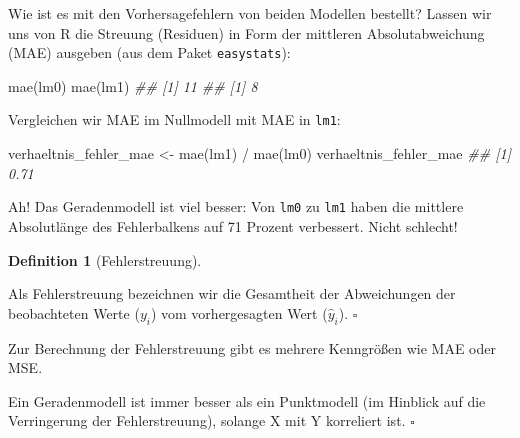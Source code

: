 \documentclass[
  letterpaper,
]{scrbook}
\newenvironment{Shaded}{\begin{snugshade}}{\end{snugshade}}
\newcommand{\DocumentationTok}[1]{\textcolor[rgb]{0.37,0.37,0.37}{\textit{#1}}}
\newcommand{\FunctionTok}[1]{\textcolor[rgb]{0.28,0.35,0.67}{#1}}
\newcommand{\NormalTok}[1]{\textcolor[rgb]{0.00,0.23,0.31}{#1}}
\newcommand{\OtherTok}[1]{\textcolor[rgb]{0.00,0.23,0.31}{#1}}
\newcommand{\SpecialCharTok}[1]{\textcolor[rgb]{0.37,0.37,0.37}{#1}}
\theoremstyle{definition}
\theoremstyle{definition}
\theoremstyle{definition}
\newtheorem{definition}{Definition}[chapter]
\theoremstyle{remark}
\begin{document}
Wie ist es mit den Vorhersagefehlern von beiden Modellen bestellt?
Lassen wir uns von R die Streuung (Residuen) in Form der mittleren
Absolutabweichung (MAE) ausgeben (aus dem Paket \texttt{easystats}):

\begin{Shaded}
\begin{Highlighting}[]
\FunctionTok{mae}\NormalTok{(lm0)}
\FunctionTok{mae}\NormalTok{(lm1)}
\DocumentationTok{\#\# [1] 11}
\DocumentationTok{\#\# [1] 8}
\end{Highlighting}
\end{Shaded}

Vergleichen wir MAE im Nullmodell mit MAE in \texttt{lm1}:

\begin{Shaded}
\begin{Highlighting}[]
\NormalTok{verhaeltnis\_fehler\_mae }\OtherTok{\textless{}{-}} \FunctionTok{mae}\NormalTok{(lm1) }\SpecialCharTok{/} \FunctionTok{mae}\NormalTok{(lm0)}
\NormalTok{verhaeltnis\_fehler\_mae}
\DocumentationTok{\#\# [1] 0.71}
\end{Highlighting}
\end{Shaded}

Ah! Das Geradenmodell ist viel besser: Von \texttt{lm0} zu \texttt{lm1}
haben die mittlere Absolutlänge des Fehlerbalkens auf 71 Prozent
verbessert. Nicht schlecht!

\begin{definition}[Fehlerstreuung]\protect\hypertarget{def-fehlerstreung}{}\label{def-fehlerstreung}

Als Fehlerstreuung bezeichnen wir die Gesamtheit der Abweichungen der
beobachteten Werte (\(y_i\)) vom vorhergesagten Wert (\(\hat{y}_i\)).
\(\square\)

\end{definition}

Zur Berechnung der Fehlerstreuung gibt es mehrere Kenngrößen wie MAE
oder MSE.

\begin{tcolorbox}[enhanced jigsaw, colbacktitle=quarto-callout-note-color!10!white, toptitle=1mm, colframe=quarto-callout-note-color-frame, breakable, toprule=.15mm, bottomrule=.15mm, bottomtitle=1mm, left=2mm, opacitybacktitle=0.6, colback=white, arc=.35mm, coltitle=black, title=\textcolor{quarto-callout-note-color}{\faInfo}\hspace{0.5em}{Hinweis}, opacityback=0, rightrule=.15mm, leftrule=.75mm, titlerule=0mm]

Ein Geradenmodell ist immer besser als ein Punktmodell (im Hinblick auf
die Verringerung der Fehlerstreuung), solange X mit Y korreliert ist.
\(\square\)

\end{tcolorbox}
\end{document}
